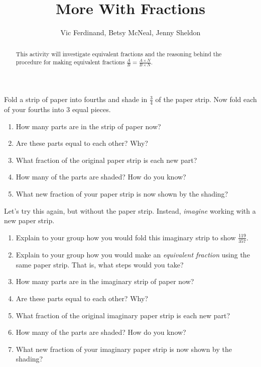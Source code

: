 \documentclass{ximera}
\title{More With Fractions}
\author{Vic Ferdinand, Betsy McNeal, Jenny Sheldon}
\begin{document}
\begin{abstract}
 This activity will investigate equivalent fractions and the reasoning behind the procedure for making equivalent fractions $\frac{A}{B} = \frac{A \times N}{B \times N}$.
\end{abstract}
\maketitle



\begin{problem} \label{MoreWithFractions1}
Fold a strip of paper into fourths and shade in $\frac{3}{4}$ of the paper strip. Now fold each of your fourths into 3 equal pieces.  
\begin{enumerate}
    \item   How many parts are in the strip of paper now?
    \item   Are these parts equal to each other?  Why?
    \item   What fraction of the original paper strip is each new part?
    \item   How many of the parts are shaded?  How do you know?
    \item   What new fraction of your paper strip is now shown by the shading?  
   
\end{enumerate}
\end{problem}

\begin{problem} \label{MoreWithFractions2}
 Let's try this again, but without the paper strip.  Instead, \emph{imagine} working with a new paper strip.  
\begin{enumerate}
    \item Explain to your group how you would fold this imaginary strip to show $\frac{119}{357}$.   
    \item Explain to your group how you would make an \emph{equivalent fraction} using the same paper strip.  That is, what steps would you take?
   \item   How many parts are in the imaginary strip of paper now?
    \item   Are these parts equal to each other?  Why?
    \item   What fraction of the original imaginary paper strip is each new part?
    \item   How many of the parts are shaded? How do you know?
    \item   What new fraction of your imaginary paper strip is now shown by the shading?  
\end{enumerate}
\end{problem}
\end{document}
